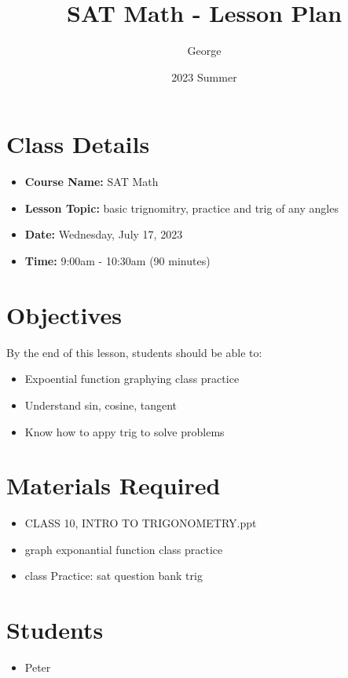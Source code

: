 \documentclass[12pt]{article}
\title{SAT Math - Lesson Plan}
\author{George}
\date{2023 Summer}
\begin{document}
\maketitle

\section{Class Details}
\begin{itemize}
    \item \textbf{Course Name:} SAT Math
    \item \textbf{Lesson Topic:}  basic trignomitry, practice and trig of any angles
    \item \textbf{Date:} Wednesday, July 17, 2023
    \item \textbf{Time:} 9:00am - 10:30am (90 minutes)
\end{itemize}

\section{Objectives}
By the end of this lesson, students should be able to:
\begin{itemize}
    \item Expoential function graphying class practice
    \item Understand sin, cosine, tangent
    \item Know how to appy trig to solve problems

\end{itemize}

\section{Materials Required}
\begin{itemize}
   
    \item CLASS 10, INTRO TO TRIGONOMETRY.ppt
    \item graph exponantial function class practice
    \item class Practice: sat question bank trig

  
\end{itemize}


\section{Students}
\begin{itemize}
    \item Peter

\end{itemize}
\end{document}
